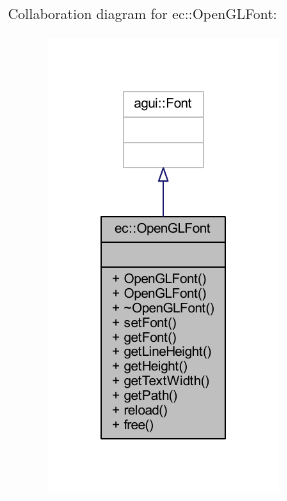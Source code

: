 Collaboration diagram for ec\+:\+:Open\+G\+L\+Font\+:\nopagebreak
\begin{figure}[H]
\begin{center}
\leavevmode
\includegraphics[width=173pt]{classec_1_1_open_g_l_font__coll__graph}
\end{center}
\end{figure}
